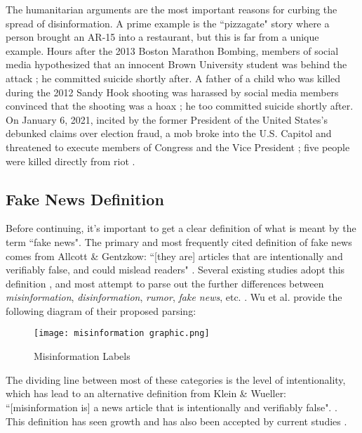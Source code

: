\documentclass[preprint,review,12pt]{elsarticle}
\begin{document}
The humanitarian arguments are the most important reasons for curbing the spread of disinformation. A prime example is the ``pizzagate" story where a person brought an AR-15 into a restaurant, but this is far from a unique example. Hours after the 2013 Boston Marathon Bombing, members of social media hypothesized that an innocent Brown University student was behind the attack \cite{starbird2014rumors}; he committed suicide shortly after. A father of a child who was killed during the 2012 Sandy Hook shooting was harassed by social media members convinced that the shooting was a hoax \cite{williamson2019alex}; he too committed suicide shortly after. On January 6, 2021, incited by the former President of the United States's debunked claims over election fraud, a mob broke into the U.S. Capitol and threatened to execute members of Congress and the Vice President \cite{fandos2021trump}; five people were killed directly from riot \cite{Levenson2021capitol}.

\subsection{Fake News Definition}
\label{Fake News Definition Section}
Before continuing, it's important to get a clear definition of what is meant by the term ``fake news". The primary and most frequently cited definition of fake news comes from Allcott \& Gentzkow: ``[they are] articles that are intentionally and verifiably false, and could mislead readers" \cite{allcott2017social}. Several existing studies adopt this definition \cite{conroy2015automatic,klein2017fake,rubin2015deception,rubin2017deception,mustafaraj2017fake,potthast2017stylometric}, and most attempt to parse out the further differences between \textit{misinformation}, \textit{disinformation}, \textit{rumor}, \textit{fake news}, etc. \cite{zimdars2020fake,  difonzo2007rumor,flynn2017nature,garrett2013undermining,wu2016mining}. Wu et al. provide the following diagram of their proposed parsing:
 \begin{figure}[htp]
    \centering
    \texttt{[image: misinformation graphic.png]}
    \caption{Misinformation Labels \cite{wu2016mining}}
    \label{fig:misinformation graphic.png}
\end{figure}


The dividing line between most of these categories is the level of intentionality, which has lead to an alternative definition from Klein \& Wueller: ``[misinformation is] a news article that is intentionally and verifiably false". \cite{klein2017fake}. This definition has seen growth and has also been accepted by current studies \cite{shu2017fake, liu2018early}.
\end{document}
